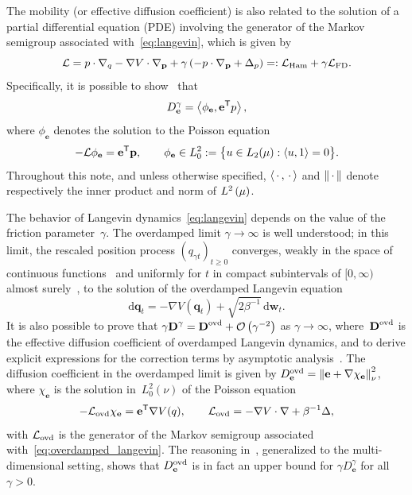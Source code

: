 \documentclass[11pt,a4paper]{article}
\newcommand{\laplacian}{\Delta}
\newcommand{\dummy}{\,\cdot\,}
\newcommand{\grad}{\nabla}
\newcommand{\vect}[1]{\boldsymbol{\mathbf #1}}
\newcommand{\mat}[1]{\vect #1}
\renewcommand{\d}{\mathrm d}
\renewcommand{\t}{\mathsf T}
\theoremstyle{plain}
\numberwithin{equation}{section}
\renewcommand{\geq}{\geqslant}
\begin{document}
The mobility (or effective diffusion coefficient)
is also related to the solution of a partial differential equation (PDE) involving the generator of the Markov semigroup associated with~\eqref{eq:langevin},
which is given by
\begin{equation}
    \label{eq:decomposition_generator}
    \mathcal L
    = p \cdot \grad_q - \grad V \cdot \grad_{\vect p} + \gamma \left( - p \cdot \grad_{\vect p} + \laplacian_p \right)
    =: \mathcal L_{\rm Ham} + \gamma \mathcal L_{\rm FD}.
\end{equation}
Specifically, it is possible to  show~\cite{pavliotis2008multiscale,MR3509213} that
\begin{equation}
    \label{eq:effective_diffusion_poisson}
    D^{\gamma}_{\vect e} = \ip{\phi_{\vect e}}{\vect e^\t p},
\end{equation}
where $\phi_{\vect e}$ denotes
the solution to the Poisson equation
\begin{equation}
    \label{eq:poisson_equation}
    - \mathcal L \phi_{\vect e} = \vect e^\t \vect p,
    \qquad \phi_{\vect e} \in L^2_0 := \bigl\{ u \in L_2(\mu): \ip{u}{1} = 0 \bigr\}.
\end{equation}
Throughout this note,
and unless otherwise specified,
$\ip{\dummy}{\dummy}$ and $\norm{\dummy}$ denote respectively the inner product and norm of $\lp{2}{\mu}$.

The behavior of Langevin dynamics~\eqref{eq:langevin} depends on the value of the friction parameter~$\gamma$.
The overdamped limit $\gamma \to \infty$ is well understood;
in this limit, the rescaled position process $(q_{\gamma t})_{t \geq 0}$
converges, weakly in the space of continuous functions~\cite{MR4054345}
and uniformly for $t$ in compact subintervals of $[0, \infty)$ almost surely~\cite{MR0214150},
to the solution of the overdamped Langevin equation
\begin{equation}
    \label{eq:overdamped_langevin}
    \d \vect q_t = - \grad V(\vect q_t) + \sqrt{2 \beta^{-1}} \, \d \vect w_t.
\end{equation}
It is also possible to prove that $\gamma \mat D^{\gamma} = \mat D^{\rm ovd} + \bigo{\gamma^{-2}}$ as $\gamma \to \infty$,
where~$\mat D^{\rm ovd}$ is the effective diffusion coefficient of overdamped Langevin dynamics,
and to derive explicit expressions for the correction terms by asymptotic analysis~\cite{MR2394704}.
The diffusion coefficient in the overdamped limit is given by $D^{\rm ovd}_{\vect e} = \norm{\vect e + \grad \chi_{\vect e}}[\nu]^2$,
where $\chi_{\vect e}$ is the solution in~$L^2_0(\nu)$ of the Poisson equation
\[
    - \mathcal L_{\rm ovd} \chi_{\vect e} = \vect e^\t \grad V(q), \qquad \mathcal L_{\rm ovd} = - \grad V \cdot \grad + \beta^{-1} \laplacian,
\]
with $\mathcal L_{\rm ovd}$ is the generator of the Markov semigroup associated with~\eqref{eq:overdamped_langevin}.
The reasoning in~\cite[Proposition 4.1]{MR2394704},
generalized to the multi-dimensional setting,
shows that $D^{\rm ovd}_{\vect e}$ is in fact an upper bound for $\gamma D^{\gamma}_{\vect e}$ for all $\gamma > 0$.
\end{document}
